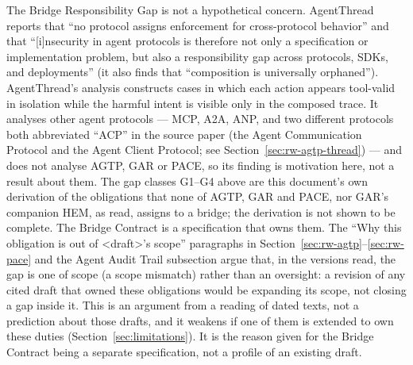 The Bridge Responsibility Gap is not a hypothetical concern. AgentThread
\cite{zheng2026formal} reports that ``no protocol assigns
enforcement for cross-protocol behavior'' and that ``[i]nsecurity in
agent protocols is therefore not only a specification or implementation
problem, but also a responsibility gap across protocols, SDKs, and
deployments'' (it also finds that ``composition is
universally orphaned''). AgentThread's analysis constructs
cases in which each action appears tool-valid in isolation while the
harmful intent is visible only in the composed trace. It analyses other
agent protocols --- MCP, A2A, ANP, and two different protocols both
abbreviated ``ACP'' in the source paper (the Agent Communication
Protocol and the Agent Client Protocol; see Section~\ref{sec:rw-agtp-thread}) --- and does not analyse AGTP, GAR or PACE, so its finding is
motivation here, not a result about them. The gap classes G1--G4 above are
this document's own derivation of the obligations that none of AGTP, GAR and PACE, nor GAR's companion HEM, as read, assigns to a bridge; the derivation is not shown to be
complete. The Bridge Contract is a specification that owns them. The
``Why this obligation is out of <draft>'s scope'' paragraphs in
Section~\ref{sec:rw-agtp}--\ref{sec:rw-pace} and the Agent Audit
Trail subsection argue that, in the versions read, the gap is one of scope (a scope
mismatch) rather than an oversight: a revision of any cited draft that
owned these obligations would be expanding its scope, not closing a gap
inside it. This is an argument from a reading of dated texts, not a
prediction about those drafts, and it weakens if one of them is
extended to own these duties (Section~\ref{sec:limitations}). It is the
reason given for the Bridge Contract being a separate specification, not
a profile of an existing draft.

